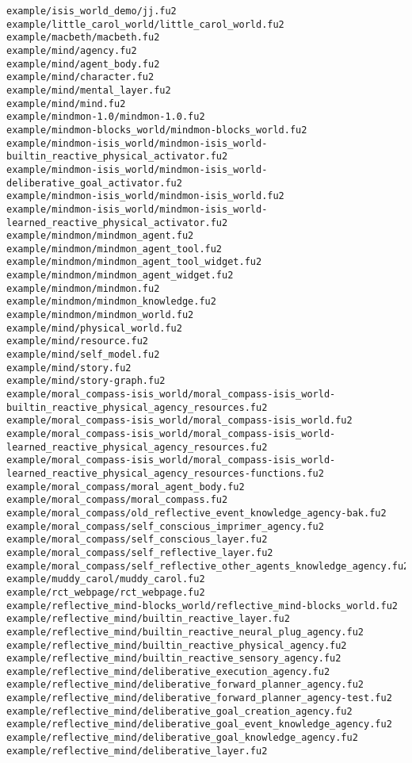 \begin{lstlisting}
example/isis_world_demo/jj.fu2
example/little_carol_world/little_carol_world.fu2
example/macbeth/macbeth.fu2
example/mind/agency.fu2
example/mind/agent_body.fu2
example/mind/character.fu2
example/mind/mental_layer.fu2
example/mind/mind.fu2
example/mindmon-1.0/mindmon-1.0.fu2
example/mindmon-blocks_world/mindmon-blocks_world.fu2
example/mindmon-isis_world/mindmon-isis_world-builtin_reactive_physical_activator.fu2
example/mindmon-isis_world/mindmon-isis_world-deliberative_goal_activator.fu2
example/mindmon-isis_world/mindmon-isis_world.fu2
example/mindmon-isis_world/mindmon-isis_world-learned_reactive_physical_activator.fu2
example/mindmon/mindmon_agent.fu2
example/mindmon/mindmon_agent_tool.fu2
example/mindmon/mindmon_agent_tool_widget.fu2
example/mindmon/mindmon_agent_widget.fu2
example/mindmon/mindmon.fu2
example/mindmon/mindmon_knowledge.fu2
example/mindmon/mindmon_world.fu2
example/mind/physical_world.fu2
example/mind/resource.fu2
example/mind/self_model.fu2
example/mind/story.fu2
example/mind/story-graph.fu2
example/moral_compass-isis_world/moral_compass-isis_world-builtin_reactive_physical_agency_resources.fu2
example/moral_compass-isis_world/moral_compass-isis_world.fu2
example/moral_compass-isis_world/moral_compass-isis_world-learned_reactive_physical_agency_resources.fu2
example/moral_compass-isis_world/moral_compass-isis_world-learned_reactive_physical_agency_resources-functions.fu2
example/moral_compass/moral_agent_body.fu2
example/moral_compass/moral_compass.fu2
example/moral_compass/old_reflective_event_knowledge_agency-bak.fu2
example/moral_compass/self_conscious_imprimer_agency.fu2
example/moral_compass/self_conscious_layer.fu2
example/moral_compass/self_reflective_layer.fu2
example/moral_compass/self_reflective_other_agents_knowledge_agency.fu2
example/muddy_carol/muddy_carol.fu2
example/rct_webpage/rct_webpage.fu2
example/reflective_mind-blocks_world/reflective_mind-blocks_world.fu2
example/reflective_mind/builtin_reactive_layer.fu2
example/reflective_mind/builtin_reactive_neural_plug_agency.fu2
example/reflective_mind/builtin_reactive_physical_agency.fu2
example/reflective_mind/builtin_reactive_sensory_agency.fu2
example/reflective_mind/deliberative_execution_agency.fu2
example/reflective_mind/deliberative_forward_planner_agency.fu2
example/reflective_mind/deliberative_forward_planner_agency-test.fu2
example/reflective_mind/deliberative_goal_creation_agency.fu2
example/reflective_mind/deliberative_goal_event_knowledge_agency.fu2
example/reflective_mind/deliberative_goal_knowledge_agency.fu2
example/reflective_mind/deliberative_layer.fu2

\end{lstlisting}
